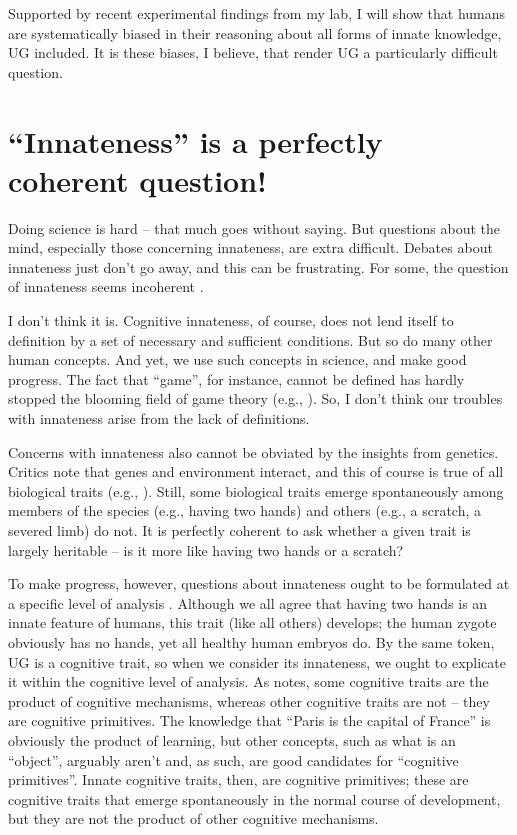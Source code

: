 \documentclass[output=paper,colorlinks,citecolor=brown
]{langscibook}
\begin{document}
Supported by recent experimental findings from my lab, I will show that humans are systematically biased in their reasoning about all forms of innate knowledge, UG included. It is these biases, I believe, that render UG a particularly difficult question.

\section{``Innateness'' is a perfectly coherent question!}
Doing science is hard -- that much goes without saying. But questions about the mind, especially those concerning innateness, are extra difficult. Debates about innateness just don’t go away, and this can be frustrating. For some, the question of innateness seems incoherent \citep{mameli2011evaluation}. 

I don’t think it is. Cognitive innateness, of course, does not lend itself to definition by a set of necessary and sufficient conditions. But so do many other human concepts. And yet, we use such concepts in science, and make good progress. The fact that ``game'', for instance, cannot be defined \citep{wittgenstein1953philosophical} has hardly stopped the blooming field of game theory (e.g., \cite{nowak1999evolution}).  So, I don’t think our troubles with innateness arise from the lack of definitions.\largerpage

Concerns with innateness also cannot be obviated by the insights from genetics. Critics note that genes and environment interact, and this of course is true of all biological traits (e.g., \cite{ridley2003nature}). Still, some biological traits emerge spontaneously among members of the species (e.g., having two hands) and others (e.g., a scratch, a severed limb) do not. It is perfectly coherent to ask whether a given trait is largely heritable -- is it more like having two hands or a scratch?

To make progress, however, questions about innateness ought to be formulated at a specific level of analysis \citep{samuels2004innateness}. Although we all agree that having two hands is an innate feature of humans, this trait (like all others) develops; the human zygote obviously has no hands, yet all healthy human embryos do. 
By the same token, UG is a cognitive trait, so when we consider its innateness, we ought to explicate it within the cognitive level of analysis. As \citet{samuels2004innateness} notes, some cognitive traits are the product of cognitive mechanisms, whereas other cognitive traits are not -- they are cognitive primitives. The knowledge that ``Paris is the capital of France'' is obviously the product of learning, but other concepts, such as what is an ``object'', arguably aren’t and, as such, are good candidates for ``cognitive primitives''. Innate cognitive traits, then, are cognitive primitives; these are cognitive traits that emerge spontaneously in the normal course of development, but they are not the product of other cognitive mechanisms.
\end{document}
